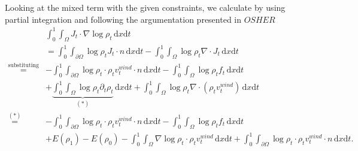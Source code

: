 Looking at the mixed term with the given constraints, we calculate by using partial integration and following the argumentation presented in $OSHER$
 \begin{align*}
	 &\int_0^1\int_\Omega J_t \cdot \nabla\log\rho_t\,\mathrm{d}x\mathrm{d}t\\
	 &=\int_0^1\int_{\partial\Omega}\log\rho_tJ_t \cdot n%
	 \,\mathrm{d} x\mathrm{d}t - \int_0^1\int_\Omega \log\rho_t \nabla \cdot J_t%
	 \,\mathrm{d}x\mathrm{d}t\\
	 \overset{\text{substituting equations}}{=}&-\int_0^1\int_{\partial\Omega} \log\rho_t \cdot \rho_tv_t^{wind} \cdot n \,\mathrm{d}x \mathrm{d}t - \int_0^1\int_\Omega\log\rho_tf_t\,\mathrm{d}x\mathrm{d}t \\
											   &+ \underbrace{\int_0^1\int_\Omega\log\rho_t\partial_t\rho_t}_{(*)} \,\mathrm{d}x\mathrm{d}t+ \int_0^1\int_\Omega \log\rho_t\nabla \cdot (\rho_tv_t^{wind})\,\mathrm{d}x\mathrm{d}t\\
	 \overset{(*)}{=} &- \int_0^1\int_{\partial\Omega} \log\rho_t \cdot \rho_tv_t^{wind} \cdot n \,\mathrm{d}x\mathrm{d}t - \int_0^1\int_\Omega\log\rho_tf_t\, \mathrm{d}x\mathrm{d}t\\
	   &+ E(\rho_1) - E(\rho_0) - \int_0^1\int_\Omega \nabla\log\rho_t \cdot \rho_tv_t^{wind} \,\mathrm{d}x\mathrm{d}t + \int_0^1\int_{\partial\Omega} \log\rho_t \cdot \rho_tv_t^{wind} \cdot n \,\mathrm{d}x\mathrm{d}t.
 \end{align*}
 
